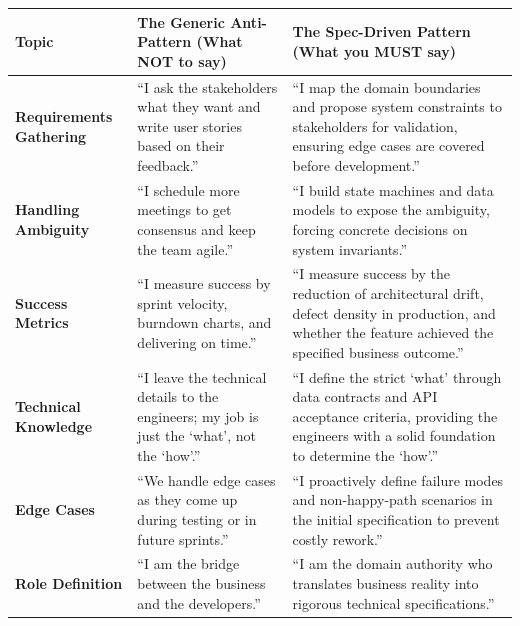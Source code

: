 \begin{longtable}[]{@{}
  >{\raggedright\arraybackslash}p{}
  >{\raggedright\arraybackslash}p{}
  >{\raggedright\arraybackslash}p{}@{}}
\toprule\noalign{}
\begin{minipage}[b]{\linewidth}\raggedright
Topic
\end{minipage} & \begin{minipage}[b]{\linewidth}\raggedright
The Generic Anti-Pattern (What NOT to say)
\end{minipage} & \begin{minipage}[b]{\linewidth}\raggedright
The Spec-Driven Pattern (What you MUST say)
\end{minipage} \\
\midrule\noalign{}
\endhead
\bottomrule\noalign{}
\endlastfoot
\textbf{Requirements Gathering} & ``I ask the stakeholders what they
want and write user stories based on their feedback.'' & ``I map the
domain boundaries and propose system constraints to stakeholders for
validation, ensuring edge cases are covered before development.'' \\
\textbf{Handling Ambiguity} & ``I schedule more meetings to get
consensus and keep the team agile.'' & ``I build state machines and data
models to expose the ambiguity, forcing concrete decisions on system
invariants.'' \\
\textbf{Success Metrics} & ``I measure success by sprint velocity,
burndown charts, and delivering on time.'' & ``I measure success by the
reduction of architectural drift, defect density in production, and
whether the feature achieved the specified business outcome.'' \\
\textbf{Technical Knowledge} & ``I leave the technical details to the
engineers; my job is just the `what', not the `how'.'' & ``I define the
strict `what' through data contracts and API acceptance criteria,
providing the engineers with a solid foundation to determine the
`how'.'' \\
\textbf{Edge Cases} & ``We handle edge cases as they come up during
testing or in future sprints.'' & ``I proactively define failure modes
and non-happy-path scenarios in the initial specification to prevent
costly rework.'' \\
\textbf{Role Definition} & ``I am the bridge between the business and
the developers.'' & ``I am the domain authority who translates business
reality into rigorous technical specifications.'' \\
\end{longtable}

